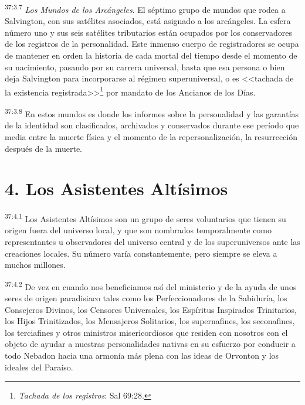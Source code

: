 \par
\textsuperscript{37:3.7} \textit{Los Mundos de los Arcángeles}. El séptimo grupo de mundos que rodea a Salvington, con sus satélites asociados, está asignado a los arcángeles. La esfera número uno y sus seis satélites tributarios están ocupados por los conservadores de los registros de la personalidad. Este inmenso cuerpo de registradores se ocupa de mantener en orden la historia de cada mortal del tiempo desde el momento de su nacimiento, pasando por su carrera universal, hasta que esa persona o bien deja Salvington para incorporarse al régimen superuniversal, o es <<tachada de la existencia registrada>>\footnote{\textit{Tachada de los registros}: Sal 69:28.} por mandato de los Ancianos de los Días.

\par
\textsuperscript{37:3.8} En estos mundos es donde los informes sobre la personalidad y las garantías de la identidad son clasificados, archivados y conservados durante ese período que media entre la muerte física y el momento de la repersonalización, la resurrección después de la muerte.

\section*{4. Los Asistentes Altísimos}
\par
\textsuperscript{37:4.1} Los Asistentes Altísimos son un grupo de seres voluntarios que tienen su origen fuera del universo local, y que son nombrados temporalmente como representantes u observadores del universo central y de los superuniversos ante las creaciones locales. Su número varía constantemente, pero siempre se eleva a muchos millones.

\par
\textsuperscript{37:4.2} De vez en cuando nos beneficiamos así del ministerio y de la ayuda de unos seres de origen paradisiaco tales como los Perfeccionadores de la Sabiduría, los Consejeros Divinos, los Censores Universales, los Espíritus Inspirados Trinitarios, los Hijos Trinitizados, los Mensajeros Solitarios, los supernafines, los seconafines, los terciafines y otros ministros misericordiosos que residen con nosotros con el objeto de ayudar a nuestras personalidades nativas en su esfuerzo por conducir a todo Nebadon hacia una armonía más plena con las ideas de Orvonton y los ideales del Paraíso.

